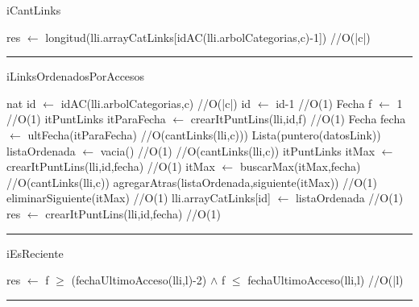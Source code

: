 \begin{algorithm}[H]
\caption{iCantLinks}
\begin{algorithmic}[1]
\state res $\gets$ longitud(lli.arrayCatLinks[idAC(lli.arbolCategorias,c)-1]) \hfill //O(|c|)
\EndFunction 
\end{algorithmic}
\hrule
{}
\end{algorithm}

\begin{algorithm}[H]
\caption{iLinksOrdenadosPorAccesos}
\begin{algorithmic}[1]
\state nat id $\gets$ idAC(lli.arbolCategorias,c) \hfill//O(|c|)
\state id $\gets$ id-1 \hfill //O(1)
\state Fecha f $\gets$ 1 \hfill //O(1)
\state itPuntLinks itParaFecha $\gets$ crearItPuntLins(lli,id,f) \hfill //O(1)
\state Fecha fecha $\gets$ ultFecha(itParaFecha) \hfill //O(cantLinks(lli,c)))
\state Lista(puntero(datosLink)) listaOrdenada $\gets$ vacia() \hfill//O(1)
\state\hfill //O(cantLinks(lli,c))
\state itPuntLinks itMax $\gets$ crearItPuntLins(lli,id,fecha) \hfill //O(1)
\state itMax $\gets$ buscarMax(itMax,fecha) \hfill //O(cantLinks(lli,c))
\state agregarAtras(listaOrdenada,siguiente(itMax)) \hfill //O(1)
\state eliminarSiguiente(itMax) \hfill //O(1)
\endwhile
\state lli.arrayCatLinks[id] $\gets$ listaOrdenada \hfill //O(1)
\endif
\state res $\gets$ crearItPuntLins(lli,id,fecha) \hfill //O(1)
\EndFunction 
\end{algorithmic}
\hrule
{}
\end{algorithm}

\begin{algorithm}[H]
\caption{iEsReciente}
\begin{algorithmic}[1]
\state res $\gets$ f $\geq$ (fechaUltimoAcceso(lli,l)-2) $\land$ f $\leq$ fechaUltimoAcceso(lli,l) \hfill//O(|l)
\EndFunction 
\end{algorithmic}
\hrule
{}
\end{algorithm}

